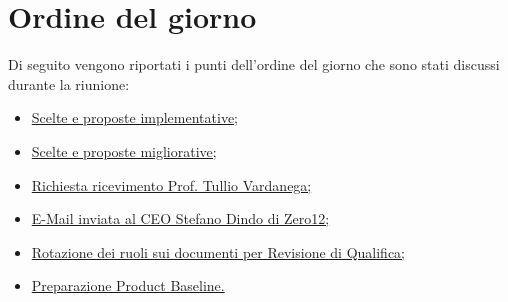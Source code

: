 \clearpage
\section{Ordine del giorno}
Di seguito vengono riportati i punti dell’ordine del giorno che sono stati discussi durante la riunione:
\begin{itemize}
	\item \hyperref[sec:implementazione]{Scelte e proposte implementative;}
	\item \hyperref[sec:migliorie]{Scelte e proposte migliorative;}
	\item \hyperref[sec:ricevimento]{Richiesta ricevimento Prof. Tullio Vardanega;}
	\item \hyperref[sec:mail_stefano]{E-Mail inviata al CEO Stefano Dindo di Zero12;}
	\item \hyperref[sec:rotazione]{Rotazione dei ruoli sui documenti per Revisione di Qualifica;}
	\item \hyperref[sec:presentazione_pb]{Preparazione Product Baseline.}
\end{itemize}